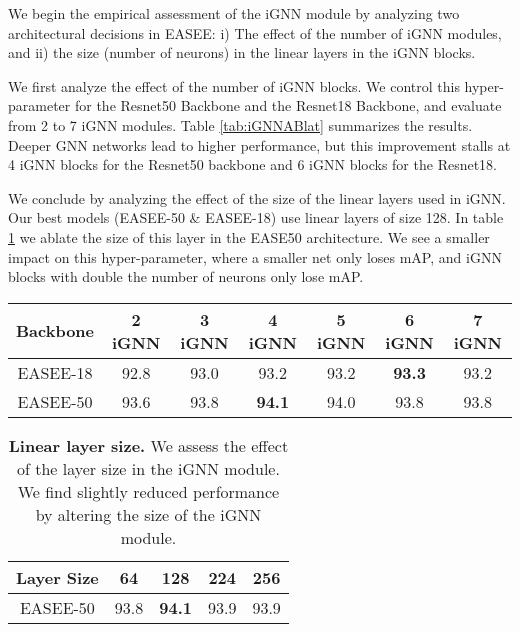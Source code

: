 \documentclass[10pt,twocolumn,letterpaper]{article}
\begin{document}
We begin the empirical assessment of the iGNN module by analyzing two architectural decisions in EASEE: i) The effect of the number of iGNN modules, and ii) the size (number of neurons) in the linear layers in the iGNN blocks.

We first analyze the effect of the number of iGNN blocks. We control this hyper-parameter for the Resnet50 Backbone and the Resnet18 Backbone, and evaluate from 2 to 7 iGNN modules. Table \ref{tab:iGNNABlat} summarizes the results. Deeper GNN networks lead to higher performance, but this improvement stalls at 4 iGNN blocks for the Resnet50 backbone and 6 iGNN blocks for the Resnet18.

We conclude by analyzing the effect of the size of the linear layers used in iGNN. Our best models (EASEE-50 \& EASEE-18) use linear layers of size 128. In table \ref{tab:filters} we ablate the size of this layer in the EASE50 architecture. We see a smaller impact on this hyper-parameter, where a smaller net only loses  mAP, and iGNN blocks with double the number of neurons only lose  mAP.

\begin{table*}[t]
    \centering
    \begin{tabular}{c c c c c c c}
        \hline
        \textbf{Backbone} & \textbf{2 iGNN} & \textbf{3 iGNN}  & \textbf{4 iGNN}  &  \textbf{5 iGNN}  & \textbf{6 iGNN} & \textbf{7 iGNN}  \\
        \hline 
        EASEE-18 & 92.8 & 93.0 & 93.2 & 93.2 & \textbf{93.3} & 93.2\\
        EASEE-50 & 93.6 & 93.8& \textbf{94.1} & 94.0 & 93.8 & 93.8  \\
        \hline
    \end{tabular}
    \caption{
        \textbf{EASEE Performance By iGNN Depth.} We analyze the effect of the number of iGNN blocks in EASEE. Stacking blocks improves the performance util 4 blocks are stacked (Resnet50) or 6 blocks are stacked (Resnet18)
    }
    \label{tab:iGNNABlat}
\end{table*}
 \begin{table}[t]
    \centering
    \begin{tabular}{c c c c c}
        \hline
        \textbf{Layer Size} \quad & \textbf{64} \quad & \textbf{128} \quad & \textbf{224} \quad  & \textbf{256}  \\
        \hline 
        EASEE-50 & 93.8 & \textbf{94.1} & 93.9 & 93.9   \\
        \hline
    \end{tabular}
    \caption{
        \textbf{Linear layer size.} We assess the effect of the layer size in the iGNN module. We find slightly reduced performance by altering the size of the iGNN module. 
    }
    \label{tab:filters}
\end{table}
\end{document}
